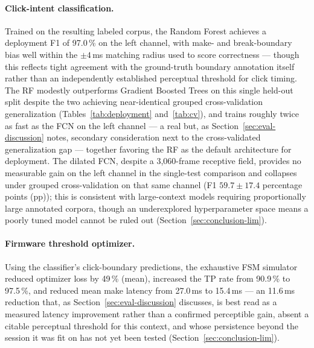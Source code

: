 \paragraph{Click-intent classification.}
Trained on the resulting labeled corpus, the Random Forest achieves a deployment
F1 of 97.0\,\% on the left channel, with make- and break-boundary bias well
within the $\pm4$\,ms matching radius used to score correctness --- though this
reflects tight agreement with the ground-truth boundary annotation itself
rather than an independently established perceptual threshold for click
timing. The RF modestly outperforms Gradient Boosted Trees on this single
held-out split despite the two achieving near-identical grouped
cross-validation generalization (Tables~\ref{tab:deployment}
and~\ref{tab:cv}), and trains roughly twice as fast as the FCN on the left
channel --- a real but, as Section~\ref{sec:eval-discussion} notes, secondary
consideration next to the cross-validated generalization gap --- together
favoring the RF as the default architecture for deployment.
The dilated FCN, despite a 3,060-frame receptive field, provides no measurable
gain on the left channel in the single-test comparison and collapses under
grouped cross-validation on that same channel (F1 $59.7 \pm 17.4$ percentage
points (pp)); this is consistent with large-context models requiring
proportionally large annotated corpora, though an underexplored hyperparameter
space means a poorly tuned model cannot be ruled out
(Section~\ref{sec:conclusion-lim}).

\paragraph{Firmware threshold optimizer.}
Using the classifier's click-boundary predictions, the exhaustive FSM simulator
reduced optimizer loss by 49\,\% (mean), increased
the TP rate from 90.9\,\% to 97.5\,\%, and reduced
mean make latency from 27.0\,ms to 15.4\,ms --- an 11.6\,ms reduction that, as
Section~\ref{sec:eval-discussion} discusses, is best read as a measured
latency improvement rather than a confirmed perceptible gain, absent a
citable perceptual threshold for this context, and whose persistence beyond
the session it was fit on has not yet been tested (Section~\ref{sec:conclusion-lim}).

